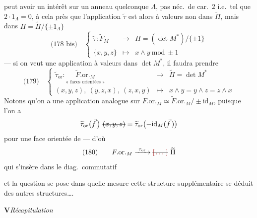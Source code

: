 \documentclass[11pt,a4paper]{article}
\begin{document}
peut avoir un intérêt sur un anneau quelconque $\Lambda$, pas néc.\ de car.\ $2$ i.e.\ tel que $2\cdot1_\Lambda=0$, à cela près que l'application $\widetilde{\tau}$ est alors à valeurs non dans $\widetilde{\Pi}$, mais dans $\Pi=\widetilde{\Pi}/\{\pm1_\Lambda\}$
\[
\text{(178 bis)}\quad
\left\{
\begin{array}{rcl}
\widetilde{\tau} : \widetilde{F}_M & \longrightarrow & \Pi = (\det M^{*})/\{\pm1\}\\
\{x,y,z\} & \longmapsto & x\wedge y \ \mathrm{mod}\ \pm1
\end{array}
\right.
\]
--- si on veut une application à valeurs dans $\det M^{*}$, il faudra prendre
\[
\text{(179)}\quad
\left\{
\begin{array}{rcl}
\widetilde{\tau}_{\mathrm{or}} : \underset{\text{« faces orientées »}}{\widetilde{F}.\mathrm{or}._M} & \longrightarrow & \widetilde{\Pi} = \det M^{*}\\[10pt]
(x,y,z),\ (y,z,x),\ (z,x,y) & \longmapsto & x\wedge y = y\wedge z = z\wedge x
\end{array}
\right.
\]
Notons qu'on a  une application analogue sur $F.\mathrm{or}._M \simeq \widetilde{F}.\mathrm{or}._M/\pm\mathrm{id}_M$, puisque l'on a
\[
\widetilde{\tau}_{\mathrm{or}}\bigl(\vec{f}\,\bigr)\ \text{\struck{$(x,y,z)$}} = \widetilde{\tau}_{\mathrm{or}}\bigl(-\mathrm{id}_M(\vec{f}\,)\bigr)
\]
pour une face orientée de  --- d'où
\[
\text{(180)}\qquad F.\mathrm{or}._M \xrightarrow{\ \tau_{\mathrm{or}}\ } \text{\struck{\ill{}}}\ \widetilde{\Pi}
\]
qui \struck{\ill{}} s'insère dans le diag.\ commutatif



et la question se pose dans quelle mesure cette structure supplémentaire se déduit des autres structures….



\textbf{V}\quad \emph{Récapitulation}
\end{document}
